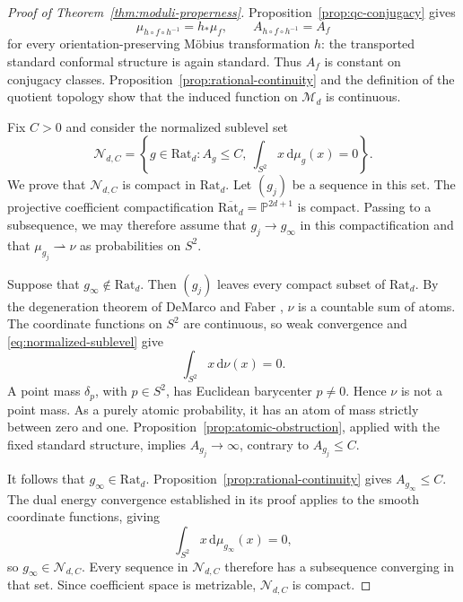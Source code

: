 \documentclass[11pt,reqno]{amsart}
\theoremstyle{plain}
\theoremstyle{definition}
\theoremstyle{remark}
\newcommand{\dd}{\mathrm d}
\numberwithin{equation}{section}
\begin{document}
\begin{proof}[Proof of Theorem~\ref{thm:moduli-properness}]
Proposition~\ref{prop:qc-conjugacy} gives
\begin{equation}\label{eq:mobius-moduli-invariance}
 \mu_{h\circ f\circ h^{-1}}=h_*\mu_f,
 \qquad A_{h\circ f\circ h^{-1}}=A_f
\end{equation}
for every orientation-preserving M\"obius transformation $h$: the transported standard conformal structure is again standard. Thus $A_f$ is constant on conjugacy classes. Proposition~\ref{prop:rational-continuity} and the definition of the quotient topology show that the induced function on $\mathcal M_d$ is continuous.

Fix $C>0$ and consider the normalized sublevel set
\begin{equation}\label{eq:normalized-sublevel}
 \mathcal N_{d,C}
 =\left\{g\in\mathrm{Rat}_d:A_g\le C,
             \ \int_{S^2}x\,\dd\mu_g(x)=0\right\}.
\end{equation}
We prove that $\mathcal N_{d,C}$ is compact in $\mathrm{Rat}_d$. Let $(g_j)$ be a sequence in this set. The projective coefficient compactification $\overline{\mathrm{Rat}_d}=\mathbb P^{2d+1}$ is compact. Passing to a subsequence, we may therefore assume that $g_j\to g_\infty$ in this compactification and that $\mu_{g_j}\rightharpoonup\nu$ as probabilities on $S^2$.

Suppose that $g_\infty\notin\mathrm{Rat}_d$. Then $(g_j)$ leaves every compact subset of $\mathrm{Rat}_d$. By the degeneration theorem of DeMarco and Faber \cite[Theorem A]{DF14}, $\nu$ is a countable sum of atoms. The coordinate functions on $S^2$ are continuous, so weak convergence and \eqref{eq:normalized-sublevel} give
\[
 \int_{S^2}x\,\dd\nu(x)=0.
\]
A point mass $\delta_p$, with $p\in S^2$, has Euclidean barycenter $p\ne0$. Hence $\nu$ is not a point mass. As a purely atomic probability, it has an atom of mass strictly between zero and one. Proposition~\ref{prop:atomic-obstruction}, applied with the fixed standard structure, implies $A_{g_j}\to\infty$, contrary to $A_{g_j}\le C$.

It follows that $g_\infty\in\mathrm{Rat}_d$. Proposition~\ref{prop:rational-continuity} gives $A_{g_\infty}\le C$. The dual energy convergence established in its proof applies to the smooth coordinate functions, giving
\[
 \int_{S^2}x\,\dd\mu_{g_\infty}(x)=0,
\]
so $g_\infty\in\mathcal N_{d,C}$. Every sequence in $\mathcal N_{d,C}$ therefore has a subsequence converging in that set. Since coefficient space is metrizable, $\mathcal N_{d,C}$ is compact.


\end{proof}
\end{document}
